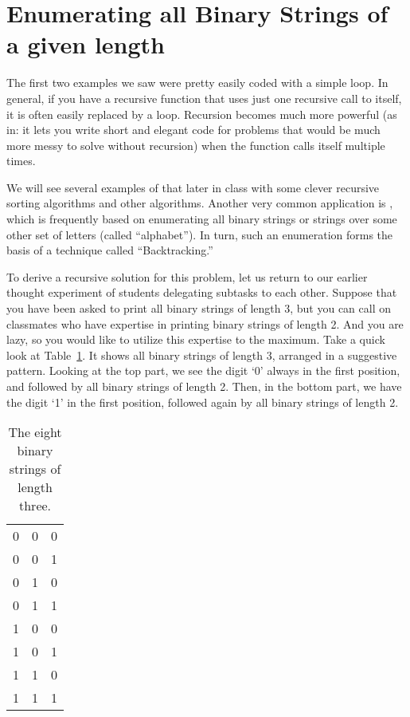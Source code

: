 \section{Enumerating all Binary Strings of a given length}
The first two examples we saw were pretty easily coded with a simple loop.
In general, if you have a recursive function that uses just one
recursive call to itself, it is often easily replaced by a loop.
Recursion becomes much more powerful
(as in: it lets you write short and elegant code for problems that
would be much more messy to solve without recursion)
when the function calls itself multiple times.

We will see several examples of that later in class with some clever
recursive sorting algorithms and other algorithms.
Another very common application is ,
which is frequently based on enumerating all binary strings or strings
over some other set of letters (called ``alphabet'').
In turn, such an enumeration forms the basis of a technique called
``Backtracking.''

To derive a recursive solution for this problem,
let us return to our earlier thought experiment of students delegating
subtasks to each other.
Suppose that you have been asked to print all binary strings of length
3, but you can call on classmates who have expertise in printing
binary strings of length 2.
And you are lazy, so you would like to utilize this expertise to the
maximum.
Take a quick look at Table~\ref{tab:recursion:binary}.
It shows all binary strings of length 3,
arranged in a suggestive pattern.
Looking at the top part,
we see the digit `0' always in the first position, 
and followed by all binary strings of length 2.
Then, in the bottom part, we have the digit `1' in the first position,
followed again by all binary strings of length 2.

\begin{table}[htb]
\begin{tabular}{|c|c c|}
  \hline
  0 & 0 & 0 \\
  0 & 0 & 1 \\
  0 & 1 & 0 \\
  0 & 1 & 1 \\ \hline

  1 & 0 & 0 \\
  1 & 0 & 1 \\
  1 & 1 & 0 \\
  1 & 1 & 1 \\ \hline
\end{tabular}
\caption{The eight binary strings of length three. \label{tab:recursion:binary}}
\end{table}

